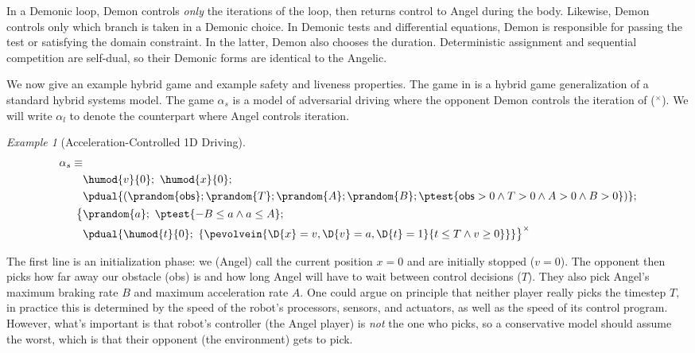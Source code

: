 \documentclass[12pt]{cmuthesis}
\theoremstyle{definition}
\theoremstyle{remark}
\newtheorem{example}{Example}
\newcommand{\obsvar}{{\sf obs}\xspace}
\newcommand{\rref}[2][]{\prettyref{#2}}
\begin{document}
In a Demonic loop, Demon controls \emph{only} the iterations of the loop, then returns control to Angel during the body.
Likewise, Demon controls only which branch is taken in a Demonic choice.
In Demonic tests and differential equations, Demon is responsible for passing the test or satisfying the domain constraint.
In the latter, Demon also chooses the duration.
Deterministic assignment and sequential competition are self-dual, so their Demonic forms are identical to the Angelic.




We now give an example hybrid game and example safety and liveness properties.
The game in \rref{ex:driving-game} is a hybrid game generalization of a standard hybrid systems model.
The game $\alpha_s$ is a model of adversarial driving where the opponent Demon controls the iteration of (${}^\times$).
We will write $\alpha_l$ to denote the counterpart where Angel controls iteration.
\begin{example}[Acceleration-Controlled 1D Driving]
\label{ex:driving-game}
\begin{align}
\alpha_s\equiv&\\
\label{eq:driving-init}&\humod{v}{0};~\humod{x}{0};\\
                               &\pdual{(\prandom{\obsvar};\prandom{T};\prandom{A};\prandom{B}; \ptest{\obsvar > 0 \land T > 0 \land A > 0 \land B > 0})};\\
\label{eq:driving-angel}\big\{ &\prandom{a};~\ptest{-B \leq a \land a \leq A};\\ 
\label{eq:driving-demon}       &\pdual{\humod{t}{0};~\{\pevolvein{\D{x}=v, \D{v}=a, \D{t}=1}{t \leq T \land v \geq 0}\}}\big\}^\times
\end{align}
\end{example}
The first line \rref{eq:driving-init} is an initialization phase: we (Angel) call the current position $x = 0$ and are initially stopped ($v = 0$).
The opponent then picks how far away our obstacle (\obsvar) is and how long Angel will have to wait between control decisions ($T$).
They also pick Angel's maximum braking rate $B$ and maximum acceleration rate $A$.
One could argue on principle that neither player really picks the timestep $T,$ in practice this is determined by the speed of the robot's processors, sensors, and actuators, as well as the speed of its control program.
However, what's important is that robot's controller (the Angel player) is \emph{not} the one who picks, so a conservative model should assume the worst, which is that their opponent (the environment) gets to pick.
\end{document}
